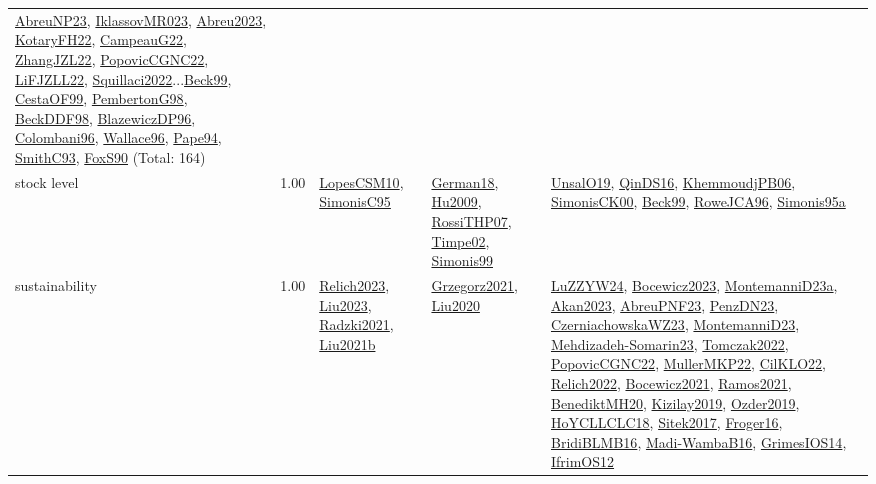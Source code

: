 {\begin{longtable}{p{3cm}r>{\raggedright\arraybackslash}p{6cm}>{\raggedright\arraybackslash}p{6cm}>{\raggedright\arraybackslash}p{8cm}}
\hyperref[detail:AbreuNP23]{AbreuNP23}, \hyperref[detail:IklassovMR023]{IklassovMR023}, \hyperref[detail:Abreu2023]{Abreu2023}, \hyperref[detail:KotaryFH22]{KotaryFH22}, \hyperref[detail:CampeauG22]{CampeauG22}, \hyperref[detail:ZhangJZL22]{ZhangJZL22}, \hyperref[detail:PopovicCGNC22]{PopovicCGNC22}, \hyperref[detail:LiFJZLL22]{LiFJZLL22}, \hyperref[detail:Squillaci2022]{Squillaci2022}...\hyperref[detail:Beck99]{Beck99}, \hyperref[detail:CestaOF99]{CestaOF99}, \hyperref[detail:PembertonG98]{PembertonG98}, \hyperref[detail:BeckDDF98]{BeckDDF98}, \hyperref[detail:BlazewiczDP96]{BlazewiczDP96}, \hyperref[detail:Colombani96]{Colombani96}, \hyperref[detail:Wallace96]{Wallace96}, \hyperref[detail:Pape94]{Pape94}, \hyperref[detail:SmithC93]{SmithC93}, \hyperref[detail:FoxS90]{FoxS90} (Total: 164)\\
\index{stock level}\index{Concepts!stock level}stock level &  1.00 & \hyperref[detail:LopesCSM10]{LopesCSM10}, \hyperref[detail:SimonisC95]{SimonisC95} & \hyperref[detail:German18]{German18}, \hyperref[detail:Hu2009]{Hu2009}, \hyperref[detail:RossiTHP07]{RossiTHP07}, \hyperref[detail:Timpe02]{Timpe02}, \hyperref[detail:Simonis99]{Simonis99} & \hyperref[detail:UnsalO19]{UnsalO19}, \hyperref[detail:QinDS16]{QinDS16}, \hyperref[detail:KhemmoudjPB06]{KhemmoudjPB06}, \hyperref[detail:SimonisCK00]{SimonisCK00}, \hyperref[detail:Beck99]{Beck99}, \hyperref[detail:RoweJCA96]{RoweJCA96}, \hyperref[detail:Simonis95a]{Simonis95a}\\
\index{sustainability}\index{Concepts!sustainability}sustainability &  1.00 & \hyperref[detail:Relich2023]{Relich2023}, \hyperref[detail:Liu2023]{Liu2023}, \hyperref[detail:Radzki2021]{Radzki2021}, \hyperref[detail:Liu2021b]{Liu2021b} & \hyperref[detail:Grzegorz2021]{Grzegorz2021}, \hyperref[detail:Liu2020]{Liu2020} & \hyperref[detail:LuZZYW24]{LuZZYW24}, \hyperref[detail:Bocewicz2023]{Bocewicz2023}, \hyperref[detail:MontemanniD23a]{MontemanniD23a}, \hyperref[detail:Akan2023]{Akan2023}, \hyperref[detail:AbreuPNF23]{AbreuPNF23}, \hyperref[detail:PenzDN23]{PenzDN23}, \hyperref[detail:CzerniachowskaWZ23]{CzerniachowskaWZ23}, \hyperref[detail:MontemanniD23]{MontemanniD23}, \hyperref[detail:Mehdizadeh-Somarin23]{Mehdizadeh-Somarin23}, \hyperref[detail:Tomczak2022]{Tomczak2022}, \hyperref[detail:PopovicCGNC22]{PopovicCGNC22}, \hyperref[detail:MullerMKP22]{MullerMKP22}, \hyperref[detail:CilKLO22]{CilKLO22}, \hyperref[detail:Relich2022]{Relich2022}, \hyperref[detail:Bocewicz2021]{Bocewicz2021}, \hyperref[detail:Ramos2021]{Ramos2021}, \hyperref[detail:BenediktMH20]{BenediktMH20}, \hyperref[detail:Kizilay2019]{Kizilay2019}, \hyperref[detail:Ozder2019]{Ozder2019}, \hyperref[detail:HoYCLLCLC18]{HoYCLLCLC18}, \hyperref[detail:Sitek2017]{Sitek2017}, \hyperref[detail:Froger16]{Froger16}, \hyperref[detail:BridiBLMB16]{BridiBLMB16}, \hyperref[detail:Madi-WambaB16]{Madi-WambaB16}, \hyperref[detail:GrimesIOS14]{GrimesIOS14}, \hyperref[detail:IfrimOS12]{IfrimOS12}\\

\end{longtable}}
